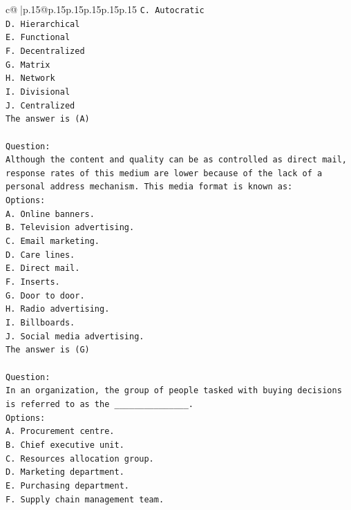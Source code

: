 \documentclass{article}
\begin{document}
{\begin{supertabular}{c@{$\;$}|p{.15\linewidth}@{}p{.15\linewidth}p{.15\linewidth}p{.15\linewidth}p{.15\linewidth}p{.15\linewidth}}
{{{\texttt{C. Autocratic} \\
\texttt{D. Hierarchical} \\
\texttt{E. Functional} \\
\texttt{F. Decentralized} \\
\texttt{G. Matrix} \\
\texttt{H. Network} \\
\texttt{I. Divisional} \\
\texttt{J. Centralized} \\
\texttt{The answer is (A)} \\
\\ 
\texttt{Question:} \\
\texttt{Although the content and quality can be as controlled as direct mail, response rates of this medium are lower because of the lack of a personal address mechanism. This media format is known as:} \\
\texttt{Options:} \\
\texttt{A. Online banners.} \\
\texttt{B. Television advertising.} \\
\texttt{C. Email marketing.} \\
\texttt{D. Care lines.} \\
\texttt{E. Direct mail.} \\
\texttt{F. Inserts.} \\
\texttt{G. Door to door.} \\
\texttt{H. Radio advertising.} \\
\texttt{I. Billboards.} \\
\texttt{J. Social media advertising.} \\
\texttt{The answer is (G)} \\
\\ 
\texttt{Question:} \\
\texttt{In an organization, the group of people tasked with buying decisions is referred to as the \_\_\_\_\_\_\_\_\_\_\_\_\_\_\_.} \\
\texttt{Options:} \\
\texttt{A. Procurement centre.} \\
\texttt{B. Chief executive unit.} \\
\texttt{C. Resources allocation group.} \\
\texttt{D. Marketing department.} \\
\texttt{E. Purchasing department.} \\
\texttt{F. Supply chain management team.} \\
}}}
\end{supertabular}}
\end{document}
